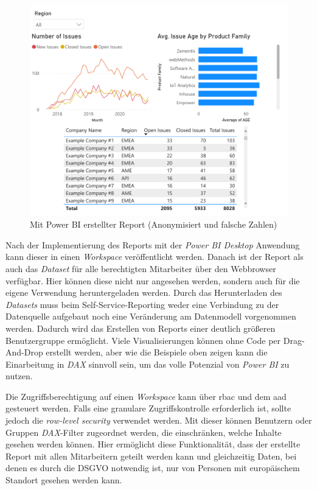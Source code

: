 \begin{figure}[htbp]
 \centering
 \includegraphics[width=\textwidth]{gfx/pbi_report.pdf}
 \caption[Power BI Report]{Mit Power BI erstellter Report (Anonymisiert und falsche Zahlen)}
\label{fig:praktischeUmsetzung:pbiRep}
\end{figure}

Nach der Implementierung des Reports mit der \textit{Power BI Desktop} Anwendung kann dieser in einen \textit{Workspace} veröffentlicht werden. Danach ist der Report als auch das \textit{Dataset} für alle berechtigten Mitarbeiter über den Webbrowser verfügbar. Hier können diese nicht nur angesehen werden, sondern auch für die eigene Verwendung heruntergeladen werden. Durch das Herunterladen des \textit{Datasets} muss beim Self-Service-Reporting weder eine Verbindung zu der Datenquelle aufgebaut noch eine Veränderung am Datenmodell vorgenommen werden. Dadurch wird das Erstellen von Reports einer deutlich größeren Benutzergruppe ermöglicht. Viele Visualisierungen können ohne Code per Drag-And-Drop erstellt werden, aber wie die Beispiele oben zeigen kann die Einarbeitung in \textit{DAX} sinnvoll sein, um das volle Potenzial von \textit{Power BI} zu nutzen.

Die Zugriffsberechtigung auf einen \textit{Workspace} kann über \ac{rbac} und dem \ac{aad} gesteuert werden. Falls eine granulare Zugriffskontrolle erforderlich ist, sollte jedoch die \textit{row-level security} verwendet werden. Mit dieser können Benutzern oder Gruppen \textit{DAX}-Filter zugeordnet werden, die einschränken, welche Inhalte gesehen werden können. Hier ermöglicht diese Funktionalität, dass der erstellte Report mit allen Mitarbeitern geteilt werden kann und gleichzeitig Daten, bei denen es durch die DSGVO notwendig ist, nur von Personen mit europäischem Standort gesehen werden kann.

